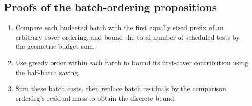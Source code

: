 

\subsection{Proofs of the batch-ordering propositions}

\begin{proofstrategy}
\begin{enumerate}
\item Compare each budgeted batch with the first equally sized prefix
      of an arbitrary cover ordering, and bound the total number of
      scheduled tests by the geometric budget sum.
\item Use greedy order within each batch to bound its first-cover
      contribution using the half-batch saving.
\item Sum these batch costs, then replace batch residuals by the comparison
      ordering's residual mass to obtain the discrete bound.
\end{enumerate}
\end{proofstrategy}

